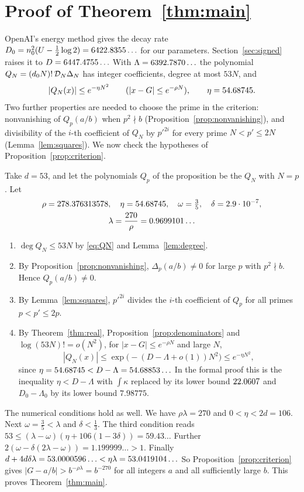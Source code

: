 \section{Proof of Theorem~\ref{thm:main}}\label{sec:proof}

OpenAI's energy method gives the decay rate $D_0=n_0^2(U-\frac12\log2)=6422.8355\ldots$ for our parameters.
Section~\ref{sec:signed} raises it to $D=6447.4755\ldots$ With $\Lambda=6392.7870\ldots$ the polynomial
$Q_N=(d_0N)!\,\mathcal D_N\Delta_N$ has integer coefficients, degree at most $53N$, and
\[
 |Q_N(x)|\le e^{-\eta N^2}\qquad(|x-G|\le e^{-\rho N}),\qquad \eta=54.68745 .
\]
Two further properties are needed to choose the prime in the criterion: nonvanishing of $Q_p(a/b)$ when
$p^2\nmid b$ (Proposition~\ref{prop:nonvanishing}), and divisibility of the $i$-th coefficient of $Q_N$ by
$p'^{2i}$ for every prime $N<p'\le2N$ (Lemma~\ref{lem:squares}). We now check the hypotheses of
Proposition~\ref{prop:criterion}.

Take $d=53$, and let the polynomials $Q_p$ of the proposition be the $Q_N$ with $N=p$. Let
\begin{gather*}
 \rho=278.376313578,\quad \eta=54.68745,\quad \omega=\tfrac35,\quad \delta=2.9\cdot10^{-7},\\
 \lambda=\frac{270}{\rho}=0.9699101\ldots
\end{gather*}
\begin{enumerate}[label=(\alph*)]
\item $\deg Q_N\le53N$ by \eqref{eq:QN} and Lemma~\ref{lem:degree}.
\item By Proposition~\ref{prop:nonvanishing}, $\Delta_p(a/b)\ne0$ for large $p$ with $p^2\nmid b$. Hence
$Q_p(a/b)\ne0$.
\item By Lemma~\ref{lem:squares}, $p'^{2i}$ divides the $i$-th coefficient of $Q_p$ for all primes
$p<p'\le2p$.
\item By Theorem~\ref{thm:real}, Proposition~\ref{prop:denominators} and $\log(53N)!=o(N^2)$, for
$|x-G|\le e^{-\rho N}$ and large $N$,
\[
 |Q_N(x)|\le\exp\bigl(-(D-\Lambda+o(1))N^2\bigr)\le e^{-\eta N^2},
\]
since $\eta=54.68745<D-\Lambda=54.68853\ldots$ In the formal proof this is the inequality $\eta<D-\Lambda$ with
$\int\kappa$ replaced by its lower bound $22.0607$ and $D_0-\Lambda_0$ by its lower bound $7.98775$.
\end{enumerate}
The numerical conditions hold as well. We have $\rho\lambda=270$ and $0<\eta<2d=106$. Next $\omega=\frac35<\lambda$ and
$\delta<\frac13$. The third condition reads $53\le(\lambda-\omega)(\eta+106(1-3\delta))=59.43\ldots$ Further
$2(\omega-\delta(2\lambda-\omega))=1.199999\ldots>1$. Finally
$d+4d\delta\lambda=53.0000596\ldots<\eta\lambda=53.0419104\ldots$ So Proposition~\ref{prop:criterion} gives
$|G-a/b|>b^{-\rho\lambda}=b^{-270}$ for all integers $a$ and all sufficiently large $b$. This proves
Theorem~\ref{thm:main}.

